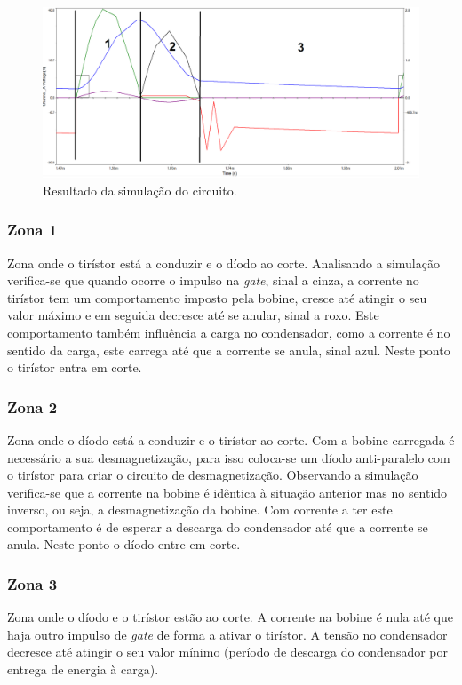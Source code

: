 \documentclass[a4paper,11pt]{article}
\numberwithin{equation}{section}
\begin{document}
\begin{figure}[h]
	\centering
	\includegraphics[keepaspectratio=true, scale=0.4]{img/funcionamento_tir}
	\caption{Resultado da simulação do circuito.}
	\label{fig:figura 1}
	\vspace{-0.8em}
\end{figure}

\subsubsection*{Zona 1}
	Zona onde o tirístor está a conduzir e o díodo ao corte.
	Analisando a simulação verifica-se que quando ocorre o impulso na \textit{gate}, sinal a cinza, a corrente no tirístor tem um comportamento imposto pela bobine, cresce até atingir o seu valor máximo e em seguida decresce até se anular, sinal a roxo. Este comportamento também influência a carga no condensador, como a corrente é no sentido da carga, este carrega até que a corrente se anula, sinal azul. Neste ponto o tirístor entra em corte.
	   
\subsubsection*{Zona 2}
	Zona onde o díodo está a conduzir e o tirístor ao corte. 
	Com a bobine carregada é necessário a sua desmagnetização, para isso coloca-se um díodo anti-paralelo com o tirístor para criar o circuito de desmagnetização. 
	Observando a simulação verifica-se que a corrente na bobine é idêntica à situação anterior mas no sentido inverso, ou seja, a desmagnetização da bobine. Com corrente a ter este comportamento é de esperar a descarga do condensador até que a corrente se anula. Neste ponto o díodo entre em corte.
	
\subsubsection*{Zona 3}
	Zona onde o díodo e o tirístor estão ao corte.
	A corrente na bobine é nula até que haja outro impulso de \textit{gate} de forma a ativar o tirístor. A tensão no condensador decresce até atingir o seu valor mínimo (período de descarga do condensador por entrega de energia à carga).
	
\end{document}
